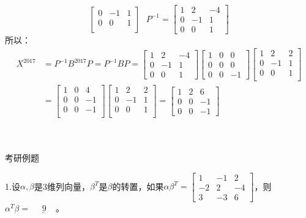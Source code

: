 \documentclass{article}
\begin{document}
\begin{jie}
\begin{equation*}
\begin{bmatrix}
0&-1&1\\
0&0&1\\
\end{bmatrix}~~~
P^{-1}=
\begin{bmatrix}
1 &2&-4\\
0&-1&1\\
0&0&1
\end{bmatrix}
\end{equation*}
所以：
\begin{align*}
X^{2017}&=P^{-1}B^{2017}P=P^{-1}BP=\begin{bmatrix}
1 &2&-4\\
0&-1&1\\
0&0&1
\end{bmatrix}
\begin{bmatrix}
  1&0&0 \\
  0&0&0\\
  0&0&-1
\end{bmatrix}
\begin{bmatrix}
1&2&2\\
0&-1&1\\
0&0&1\\
\end{bmatrix}\\
&=
\begin{bmatrix}
1&0&4\\
0&0&-1\\
0&0&-1\\
\end{bmatrix}
\begin{bmatrix}
1&2&2\\
0&-1&1\\
0&0&1\\
\end{bmatrix}=\begin{bmatrix}
1&2&6\\
0&0&-1\\
0&0&-1
\end{bmatrix}
\end{align*}
\end{jie}
{\heiti {} ~}\\
{\heiti {} ~}\\

{\heiti {} 考研例题}

  1.设$\alpha,\beta$是3维列向量，$\beta^{T}$是$\beta$的转置，如果$
  \alpha\beta^{T}=
  \begin{bmatrix}
    1 & -1 & 2 \\
    -2 & 2& -4\\
    3 & -3 & 6
  \end{bmatrix}
  $，则$\alpha^{T}\beta=\underline{~~~~~~9~~~~~}$。
\end{document}
